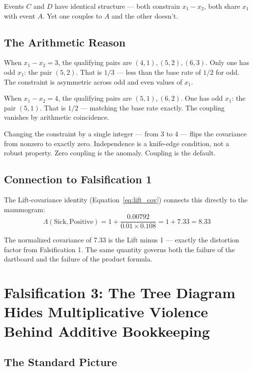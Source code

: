 \documentclass[12pt]{article}
\begin{document}
Events $C$ and $D$ have identical structure --- both constrain $x_1 - x_2$, both share $x_1$ with event $A$. Yet one couples to $A$ and the other doesn't.

\subsection{The Arithmetic Reason}

When $x_1 - x_2 = 3$, the qualifying pairs are $(4,1), (5,2), (6,3)$. Only one has odd $x_1$: the pair $(5,2)$. That is $1/3$ --- less than the base rate of $1/2$ for odd. The constraint is asymmetric across odd and even values of $x_1$.

When $x_1 - x_2 = 4$, the qualifying pairs are $(5,1), (6,2)$. One has odd $x_1$: the pair $(5,1)$. That is $1/2$ --- matching the base rate exactly. The coupling vanishes by arithmetic coincidence.

Changing the constraint by a single integer --- from 3 to 4 --- flips the covariance from nonzero to exactly zero. Independence is a knife-edge condition, not a robust property. Zero coupling is the anomaly. Coupling is the default.

\subsection{Connection to Falsification 1}

The Lift-covariance identity (Equation~\ref{eq:lift_cov}) connects this directly to the mammogram:
\begin{equation}
\Lambda(\text{Sick}, \text{Positive}) = 1 + \frac{0.00792}{0.01 \times 0.108} = 1 + 7.33 = 8.33
\end{equation}

The normalized covariance of 7.33 is the Lift minus 1 --- exactly the distortion factor from Falsification 1. The same quantity governs both the failure of the dartboard and the failure of the product formula.

\section{Falsification 3: The Tree Diagram Hides Multiplicative Violence Behind Additive Bookkeeping}

\subsection{The Standard Picture}
\end{document}
